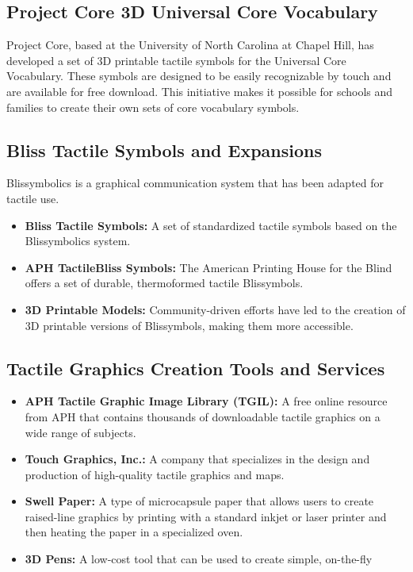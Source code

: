 \subsection{Project Core 3D Universal Core Vocabulary}\label{app6:project-core}
Project Core, based at the University of North Carolina at Chapel Hill, has developed a set of 3D printable tactile symbols for the Universal Core Vocabulary. These symbols are designed to be easily recognizable by touch and are available for free download. This initiative makes it possible for schools and families to create their own sets of core vocabulary symbols.\supercite{64ouncebraille}

\subsection{Bliss Tactile Symbols and Expansions}\label{app6:bliss-symbols}
Blissymbolics is a graphical communication system that has been adapted for tactile use.
\begin{itemize}
	\item \textbf{Bliss Tactile Symbols:} A set of standardized tactile symbols based on the Blissymbolics system.
	\item \textbf{APH TactileBliss Symbols:} The American Printing House for the Blind offers a set of durable, thermoformed tactile Blissymbols.
	\item \textbf{3D Printable Models:} Community-driven efforts have led to the creation of 3D printable versions of Blissymbols, making them more accessible.
\end{itemize}

\subsection{Tactile Graphics Creation Tools and Services}\label{app6:tactile-graphics}
\begin{itemize}
	\item \textbf{APH Tactile Graphic Image Library (TGIL):} A free online resource from APH that contains thousands of downloadable tactile graphics on a wide range of subjects.
	\item \textbf{Touch Graphics, Inc.:} A company that specializes in the design and production of high-quality tactile graphics and maps.
	\item \textbf{Swell Paper:} A type of microcapsule paper that allows users to create raised-line graphics by printing with a standard inkjet or laser printer and then heating the paper in a specialized oven.
	\item \textbf{3D Pens:} A low-cost tool that can be used to create simple, on-the-fly
\end{itemize}

